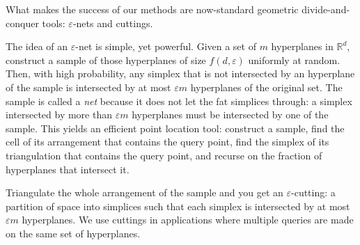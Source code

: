 What makes the success of our methods are now-standard geometric
divide-and-conquer tools: \(\varepsilon\)-nets and cuttings.

The idea of an \(\varepsilon\)-net is simple, yet powerful. Given a set of
\(m\) hyperplanes in \(\mathbb{R}^d\), construct a sample of those hyperplanes
of size \(f(d, \varepsilon)\) uniformly at random. Then, with high probability,
any simplex that is not intersected by an hyperplane of the sample is intersected
by at most \(\varepsilon m\) hyperplanes of the original set. The sample is
called a \emph{net} because it does not let the fat simplices through: a
simplex intersected by more than \(\varepsilon m\) hyperplanes must be intersected
by one of the sample.
%
This yields an efficient point location tool: construct a sample, find the cell
of its arrangement that contains the query point, find the simplex of its
triangulation that contains the query point, and recurse on the fraction of
hyperplanes that intersect it.

Triangulate the whole arrangement of the sample and you get an
\(\varepsilon\)-cutting: a partition of space into simplices such
that each simplex is intersected by at most \(\varepsilon m\) hyperplanes.
We use cuttings in applications where multiple queries are made on the same set
of hyperplanes.
